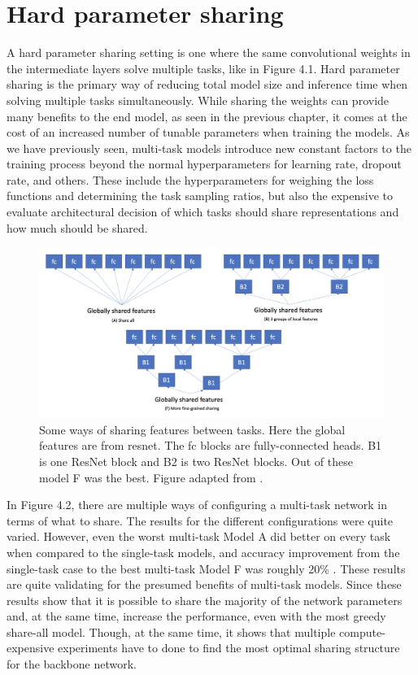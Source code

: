 \section{Hard parameter sharing}
A hard parameter sharing setting is one where the same convolutional weights in the intermediate layers solve multiple tasks, like in Figure 4.1.
Hard parameter sharing is the primary way of reducing total model size and inference time when solving multiple tasks simultaneously.
While sharing the weights can provide many benefits to the end model, as seen in the previous chapter, it comes at the cost of an increased number of tunable parameters when training the models. 
As we have previously seen, multi-task models introduce new constant factors to the training process beyond the normal hyperparameters for learning rate, dropout rate, and others.
These include the hyperparameters for weighing the loss functions and determining the task sampling ratios, but also the expensive to evaluate architectural decision of which tasks should share representations and how much should be shared.

\begin{figure}[h!] 
\centering 
\includegraphics[width=1\textwidth]{imgs/multipleShares.png}
\caption{Some ways of sharing features between tasks. Here the global features are from resnet. The fc blocks are fully-connected heads. B1 is one ResNet block and B2 is two ResNet blocks. Out of these model F was the best. Figure adapted from \citep{healthyDrink}.\label{fig:params}}
\end{figure}

In Figure 4.2, there are multiple ways of configuring a multi-task network in terms of what to share.
The results for the different configurations were quite varied. 
However, even the worst multi-task Model A did better on every task when compared to the single-task models, and accuracy improvement from the single-task case to the best multi-task Model F was roughly 20\% \citep{healthyDrink}.
These results are quite validating for the presumed benefits of multi-task models.
Since these results show that it is possible to share the majority of the network parameters and, at the same time, increase the performance, even with the most greedy share-all model.
Though, at the same time, it shows that multiple compute-expensive experiments have to done to find the most optimal sharing structure for the backbone network.

